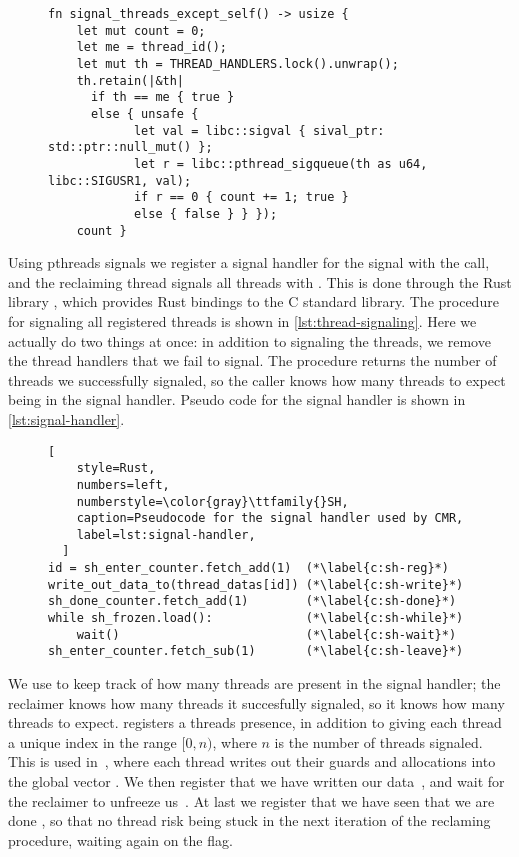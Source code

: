 \begin{figure}[ht]
  \begin{lstlisting}[style=Rust,label=lst:thread-signaling,
  caption=Thread signaling,
  ]
fn signal_threads_except_self() -> usize {
    let mut count = 0;
    let me = thread_id();
    let mut th = THREAD_HANDLERS.lock().unwrap();
    th.retain(|&th|
      if th == me { true }
      else { unsafe {
            let val = libc::sigval { sival_ptr: std::ptr::null_mut() };
            let r = libc::pthread_sigqueue(th as u64, libc::SIGUSR1, val);
            if r == 0 { count += 1; true }
            else { false } } });
    count }
\end{lstlisting}
\end{figure}

Using \gls{pthreads} signals we register a signal handler for the  signal with the
 call, and the reclaiming thread signals all threads with .
This is done through the Rust library , which provides Rust bindings to the C standard
library. The procedure for signaling all registered threads is shown in
\cref{lst:thread-signaling}. Here we actually do two things at once: in addition to signaling the
threads, we remove the thread handlers that we fail to signal. The procedure returns the number of
threads we successfully signaled, so the caller knows how many threads to expect being in the
signal handler. Pseudo code for the signal handler is shown in \cref{lst:signal-handler}.

\begin{figure}[ht]
  \begin{lstlisting}[
    style=Rust,
    numbers=left,
    numberstyle=\color{gray}\ttfamily{}SH,
    caption=Pseudocode for the signal handler used by CMR,
    label=lst:signal-handler,
  ]
id = sh_enter_counter.fetch_add(1)  (*\label{c:sh-reg}*)
write_out_data_to(thread_datas[id]) (*\label{c:sh-write}*)
sh_done_counter.fetch_add(1)        (*\label{c:sh-done}*)
while sh_frozen.load():             (*\label{c:sh-while}*)
    wait()                          (*\label{c:sh-wait}*)
sh_enter_counter.fetch_sub(1)       (*\label{c:sh-leave}*)
\end{lstlisting}
\end{figure}


We use  to keep track of how many threads are present in the signal handler;
the reclaimer knows how many threads it succesfully signaled, so it knows how many threads to
expect.  registers a threads presence, in addition to giving each thread
a unique index in the range $[0, n)$, where $n$ is the number of threads signaled. This is used
in~, where each thread writes out their guards and allocations into
the global vector . We then register that we have written our
data~, and wait for the reclaimer to unfreeze
us~. At last we register that we have seen that we are done
, so that no thread risk being stuck in the next iteration of the
reclaming procedure, waiting again on the  flag.



